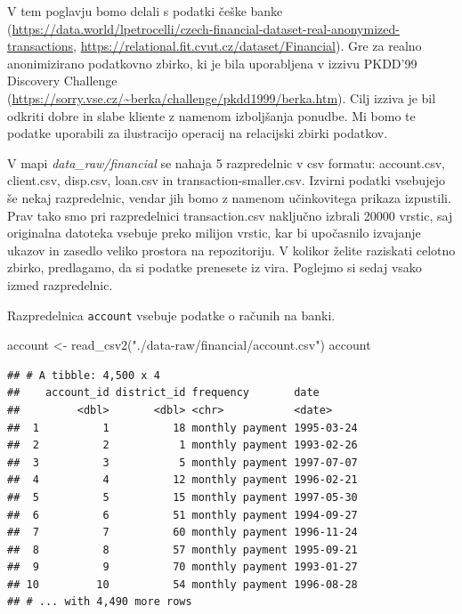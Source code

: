 \documentclass[
]{book}
\newenvironment{Shaded}{\begin{snugshade}}{\end{snugshade}}
\newcommand{\FunctionTok}[1]{\textcolor[rgb]{0.00,0.00,0.00}{#1}}
\newcommand{\NormalTok}[1]{#1}
\newcommand{\OtherTok}[1]{\textcolor[rgb]{0.56,0.35,0.01}{#1}}
\newcommand{\StringTok}[1]{\textcolor[rgb]{0.31,0.60,0.02}{#1}}
\begin{document}
V tem poglavju bomo delali s podatki češke banke (\url{https://data.world/lpetrocelli/czech-financial-dataset-real-anonymized-transactions}, \url{https://relational.fit.cvut.cz/dataset/Financial}). Gre za realno anonimizirano podatkovno zbirko, ki je bila uporabljena v izzivu PKDD'99 Discovery Challenge (\url{https://sorry.vse.cz/~berka/challenge/pkdd1999/berka.htm}). Cilj izziva je bil odkriti dobre in slabe kliente z namenom izboljšanja ponudbe. Mi bomo te podatke uporabili za ilustracijo operacij na relacijski zbirki podatkov.

V mapi \emph{data\_raw/financial} se nahaja 5 razpredelnic v csv formatu: account.csv, client.csv, disp.csv, loan.csv in transaction-smaller.csv. Izvirni podatki vsebujejo še nekaj razpredelnic, vendar jih bomo z namenom učinkovitega prikaza izpustili. Prav tako smo pri razpredelnici transaction.csv naključno izbrali 20000 vrstic, saj originalna datoteka vsebuje preko milijon vrstic, kar bi upočasnilo izvajanje ukazov in zasedlo veliko prostora na repozitoriju. V kolikor želite raziskati celotno zbirko, predlagamo, da si podatke prenesete iz vira. Poglejmo si sedaj vsako izmed razpredelnic.

Razpredelnica \texttt{account} vsebuje podatke o računih na banki.

\begin{Shaded}
\begin{Highlighting}[]
\NormalTok{account }\OtherTok{\textless{}{-}} \FunctionTok{read\_csv2}\NormalTok{(}\StringTok{"./data{-}raw/financial/account.csv"}\NormalTok{)}
\NormalTok{account}
\end{Highlighting}
\end{Shaded}

\begin{verbatim}
## # A tibble: 4,500 x 4
##    account_id district_id frequency       date      
##         <dbl>       <dbl> <chr>           <date>    
##  1          1          18 monthly payment 1995-03-24
##  2          2           1 monthly payment 1993-02-26
##  3          3           5 monthly payment 1997-07-07
##  4          4          12 monthly payment 1996-02-21
##  5          5          15 monthly payment 1997-05-30
##  6          6          51 monthly payment 1994-09-27
##  7          7          60 monthly payment 1996-11-24
##  8          8          57 monthly payment 1995-09-21
##  9          9          70 monthly payment 1993-01-27
## 10         10          54 monthly payment 1996-08-28
## # ... with 4,490 more rows
\end{verbatim}
\end{document}
